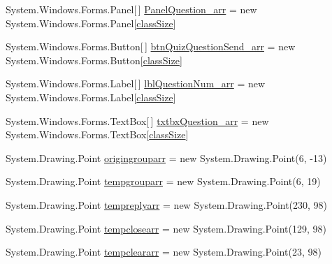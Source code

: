 \begin{DoxyCompactItemize}
\item 
\-System.\-Windows.\-Forms.\-Panel\mbox{[}$\,$\mbox{]} \hyperlink{class_sr_p___classroom_inq_1_1frm_classrrom_inq_a5c89025435cd16c638fbc91999b74f80}{\-Panel\-Question\-\_\-arr} = new \-System.\-Windows.\-Forms.\-Panel\mbox{[}\hyperlink{class_sr_p___classroom_inq_1_1frm_classrrom_inq_a78d9aab335edfe53d39036b9d89928a8}{class\-Size}\mbox{]}
\item 
\-System.\-Windows.\-Forms.\-Button\mbox{[}$\,$\mbox{]} \hyperlink{class_sr_p___classroom_inq_1_1frm_classrrom_inq_a007012d0330b5c8ad6b29271ddefe7f9}{btn\-Quiz\-Question\-Send\-\_\-arr} = new \-System.\-Windows.\-Forms.\-Button\mbox{[}\hyperlink{class_sr_p___classroom_inq_1_1frm_classrrom_inq_a78d9aab335edfe53d39036b9d89928a8}{class\-Size}\mbox{]}
\item 
\-System.\-Windows.\-Forms.\-Label\mbox{[}$\,$\mbox{]} \hyperlink{class_sr_p___classroom_inq_1_1frm_classrrom_inq_ae46e928c386c686caa96bfe4f302c2f1}{lbl\-Question\-Num\-\_\-arr} = new \-System.\-Windows.\-Forms.\-Label\mbox{[}\hyperlink{class_sr_p___classroom_inq_1_1frm_classrrom_inq_a78d9aab335edfe53d39036b9d89928a8}{class\-Size}\mbox{]}
\item 
\-System.\-Windows.\-Forms.\-Text\-Box\mbox{[}$\,$\mbox{]} \hyperlink{class_sr_p___classroom_inq_1_1frm_classrrom_inq_ac8b5f7f10341c6c43066881afcbbcaaa}{txtbx\-Question\-\_\-arr} = new \-System.\-Windows.\-Forms.\-Text\-Box\mbox{[}\hyperlink{class_sr_p___classroom_inq_1_1frm_classrrom_inq_a78d9aab335edfe53d39036b9d89928a8}{class\-Size}\mbox{]}
\item 
\-System.\-Drawing.\-Point \hyperlink{class_sr_p___classroom_inq_1_1frm_classrrom_inq_ace01ba3289e75624d67b90f742c195f5}{origingrouparr} = new \-System.\-Drawing.\-Point(6, -\/13)
\item 
\-System.\-Drawing.\-Point \hyperlink{class_sr_p___classroom_inq_1_1frm_classrrom_inq_a6c8231644b9d1f92d08f110b003d621e}{tempgrouparr} = new \-System.\-Drawing.\-Point(6, 19)
\item 
\-System.\-Drawing.\-Point \hyperlink{class_sr_p___classroom_inq_1_1frm_classrrom_inq_ac6007ba00a6fab2fca4b74c0e588e850}{tempreplyarr} = new \-System.\-Drawing.\-Point(230, 98)
\item 
\-System.\-Drawing.\-Point \hyperlink{class_sr_p___classroom_inq_1_1frm_classrrom_inq_a6ad2bdb537cfc35b174dd16dd8e03904}{tempclosearr} = new \-System.\-Drawing.\-Point(129, 98)
\item 
\-System.\-Drawing.\-Point \hyperlink{class_sr_p___classroom_inq_1_1frm_classrrom_inq_a189c01a3745fca62a8250be6a3517894}{tempcleararr} = new \-System.\-Drawing.\-Point(23, 98)

\end{DoxyCompactItemize}

